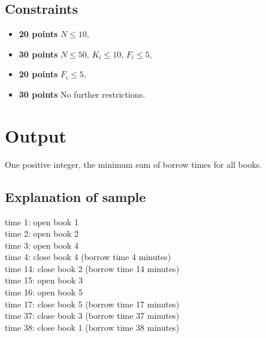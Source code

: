 \subsection*{Constraints}
\begin{itemize}
    \item{\textbf{20 points}} $N \leq 10$,
    \item{\textbf{30 points}} $N \leq 50$, $K_i \leq 10$, $F_i \leq 5$,
    \item{\textbf{20 points}} $F_i \leq 5$,
    \item{\textbf{30 points}} No further restrictions.
\end{itemize}

\section*{Output}
One positive integer, the minimum sum of borrow times for all books.

\subsection*{Explanation of sample} 
time 1: open book 1 \\
time 2: open book 2 \\
time 3: open book 4 \\
time 4: close book 4 (borrow time 4 minutes) \\
time 14: close book 2 (borrow time 14 minutes) \\
time 15: open book 3 \\
time 16: open book 5 \\
time 17: close book 5 (borrow time 17 minutes) \\
time 37: close book 3 (borrow time 37 minutes) \\
time 38: close book 1 (borrow time 38 minutes) \\

